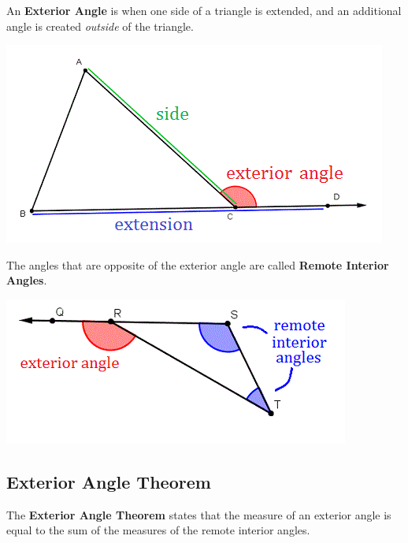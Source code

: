 \documentclass[12pt]{article}
\begin{document}
An \textbf{Exterior Angle} is when one side of a triangle is extended, and an additional angle is created \textit{outside} of the triangle.\\

\begin{center}
\includegraphics[scale=.6]{triangle6.png}\\
\end{center}

The angles that are opposite of the exterior angle are called \textbf{Remote Interior Angles}.

\begin{center}
\includegraphics[scale=.5]{triangle7.png}
\end{center}

\subsection*{Exterior Angle Theorem}

The \textbf{Exterior Angle Theorem} states that the measure of an exterior angle is equal to the sum of the measures of the remote interior angles.\\
\end{document}
